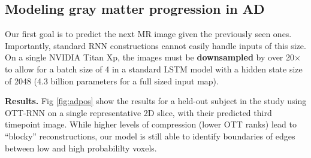 \subsection{Modeling gray matter progression in AD}
Our first goal is to predict the next MR image
given the previously seen ones. Importantly, standard RNN constructions cannot easily handle inputs of this size.
On a single NVIDIA Titan Xp, the images must be \textbf{downsampled} by over 20$\times$ to allow for a
batch size of 4 in a standard LSTM model with a hidden state size of 2048 (4.3 billion parameters for a full sized input map).

\textbf{Results.}
Fig \ref{fig:adpos} show the results for a held-out subject in the study using OTT-RNN on a single representative 2D slice,
with their predicted third timepoint image. While higher levels of compression (lower OTT ranks) lead to ``blocky'' reconstructions,
our model is still able to identify boundaries of edges between low and high probabililty voxels.

